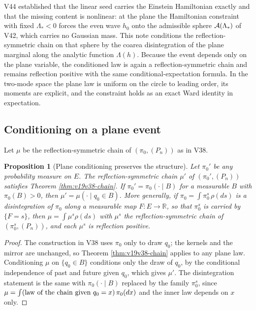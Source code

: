\documentclass[11pt]{article}
\newtheorem{proposition}[theorem]{Proposition}
\theoremstyle{remark}
\begin{document}
V44 established that the linear seed carries the Einstein Hamiltonian
exactly and that the missing content is nonlinear: at the plane the
Hamiltonian constraint with fixed \(\Lambda_*<0\) forces the even wave
\(h_0\) onto the admissible sphere \({\cal A}(\Lambda_*)\) of V42, which
carries no Gaussian mass.  This note conditions the reflection-symmetric
chain on that sphere by the coarea disintegration of the plane marginal
along the analytic function \(\Lambda(h)\).  Because the event depends
only on the plane variable, the conditioned law is again a
reflection-symmetric chain and remains reflection positive with the
same conditional-expectation formula.  In the two-mode space the plane
law is uniform on the circle to leading order, its moments are explicit,
and the constraint holds as an exact Ward identity in expectation.

\subsection{Conditioning on a plane event}

Let \(\mu\) be the reflection-symmetric chain of \((\pi_0,(P_n))\) as
in V38.

\begin{proposition}[Plane conditioning preserves the structure]
\label{prop:v19v46-conditioning}
Let \(\pi_0'\) be any probability measure on \(E\).  The
reflection-symmetric chain \(\mu'\) of \((\pi_0',(P_n))\) satisfies
Theorem \ref{thm:v19v38-chain}.  If \(\pi_0'=\pi_0(\cdot\mid B)\) for a
measurable \(B\) with \(\pi_0(B)>0\), then \(\mu'=\mu(\cdot\mid q_0\in B)\).
More generally, if \(\pi_0=\int\pi_0^s\,\rho(ds)\) is a disintegration
of \(\pi_0\) along a measurable map \(F:E\to\mathbb R\), so that
\(\pi_0^s\) is carried by \(\{F=s\}\), then \(\mu=\int\mu^s\rho(ds)\)
with \(\mu^s\) the reflection-symmetric chain of \((\pi_0^s,(P_n))\),
and each \(\mu^s\) is reflection positive.
\end{proposition}

\begin{proof}
The construction in V38 uses \(\pi_0\) only to draw \(q_0\); the
kernels and the mirror are unchanged, so Theorem
\ref{thm:v19v38-chain} applies to any plane law.  Conditioning
\(\mu\) on \(\{q_0\in B\}\) conditions only the draw of \(q_0\), by the
conditional independence of past and future given \(q_0\), which gives
\(\mu'\).  The disintegration statement is the same with
\(\pi_0(\cdot\mid B)\) replaced by the family \(\pi_0^s\), since
\(\mu=\int(\hbox{law of the chain given }q_0=x)\,\pi_0(dx)\) and the
inner law depends on \(x\) only.
\end{proof}
\end{document}
